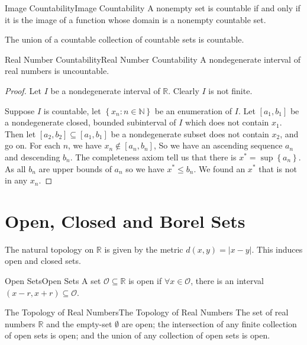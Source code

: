 \documentclass[../main.tex]{subfiles}
\begin{document}
\begin{proposition}{Image Countability}{Image Countability}
	A nonempty set is countable if and only if it is the image of a function whose domain is a nonempty countable set.
\end{proposition}

\begin{proposition}{}{}
	The union of a countable collection of countable sets is countable.
\end{proposition}

\begin{theorem}{Real Number Countability}{Real Number Countability}
	A nondegenerate interval of real numbers is uncountable.
\end{theorem}
\begin{proof}
	Let $I$ be a nondegenerate interval of $\mathbb{R}$. Clearly $I$ is not finite.

	Suppose $I$ is countable, let $\left\{ x_n:n\in \mathbb{N} \right\}$ be an enumeration of $I$. Let $[a_1, b_1]$ be a nondegenerate closed, bounded subinterval of $I$ which does not contain $x_1$. Then let $[a_2,b_2] \subseteq [a_1,b_1]$ be a nondegenerate subset does not contain $x_2$, and go on. For each $n$, we have $x_n \notin [a_n,b_n]$, So we have an ascending sequence $a_n$ and descending $b_n$. The completeness axiom tell us that there is $x^* = \sup \left\{ a_n \right\}$. As all $b_n$ are upper bounds of $a_n$ so we have $x^* \leq b_n$. We found an $x^*$ that is not in any $x_n$.
\end{proof}

\section{Open, Closed and Borel Sets}
The natural topology on $\mathbb{R}$ is given by the metric $d(x,y) = |x-y|$. This induces open and closed sets.
\begin{definition}{Open Sets}{Open Sets}
	A set $\mathcal{O} \subseteq \mathbb{R}$ is open if $\forall x\in \mathcal{O}$, there is an interval $(x-r,x+r) \subseteq \mathcal{O}$.
\end{definition}
\begin{proposition}{The Topology of Real Numbers}{The Topology of Real Numbers}
	The set of real numbers $\mathbb{R}$ and the empty-set $\emptyset $ are open; the intersection of any finite collection of open sets is open; and the union of any collection of open sets is open.
\end{proposition}
\end{document}
